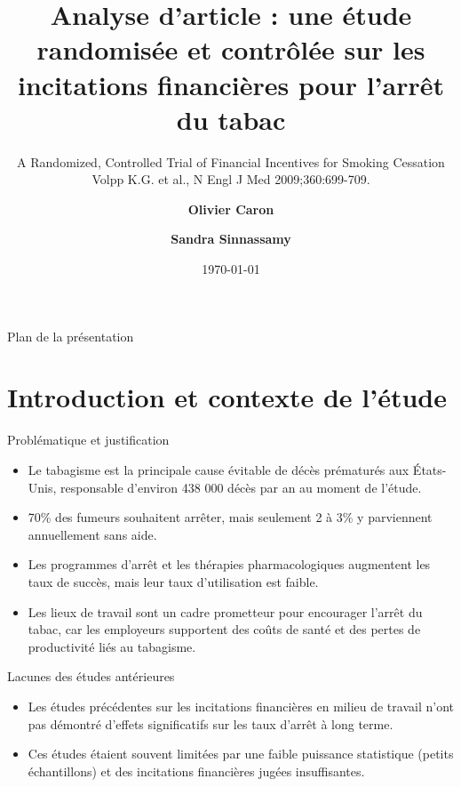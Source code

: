 \documentclass[aspectratio=169,xcolor=dvipsnames]{beamer}
\title[Analyse d'article sur les incitations financières pour l'arrêt du tabac]{Analyse d'article : une étude randomisée et contrôlée sur les incitations financières pour l'arrêt du tabac}
\subtitle{A Randomized, Controlled Trial of Financial Incentives for Smoking Cessation \\ Volpp K.G. et al., N Engl J Med 2009;360:699-709.}
\author{
\textbf{Olivier Caron} \inst{1} \and
\textbf{Sandra Sinnassamy} \inst{2}
}
\institute[1,2]{
\inst{1} Université Paris Dauphine – PSL \\
\inst{2} ENS – PSL
}
\date{\today}
\begin{document}
\begin{frame}
    \titlepage
\end{frame}

\begin{frame}{Plan de la présentation}
    \tableofcontents
\end{frame}

\section{Introduction et contexte de l'étude}

\begin{frame}{Problématique et justification}
    \begin{itemize}
        \item Le tabagisme est la principale cause évitable de décès prématurés aux États-Unis, responsable d'environ 438 000 décès par an au moment de l'étude.
        \item 70\% des fumeurs souhaitent arrêter, mais seulement 2 à 3\% y parviennent annuellement sans aide.
        \item Les programmes d'arrêt et les thérapies pharmacologiques augmentent les taux de succès, mais leur taux d'utilisation est faible.
        \item Les lieux de travail sont un cadre prometteur pour encourager l'arrêt du tabac, car les employeurs supportent des coûts de santé et des pertes de productivité liés au tabagisme.
    \end{itemize}
    \begin{alertblock}{Lacunes des études antérieures}
        \begin{itemize}
            \item Les études précédentes sur les incitations financières en milieu de travail n'ont pas démontré d'effets significatifs sur les taux d'arrêt à long terme.
            \item Ces études étaient souvent limitées par une faible puissance statistique (petits échantillons) et des incitations financières jugées insuffisantes.
        \end{itemize}
    \end{alertblock}
\end{frame}
\end{document}
